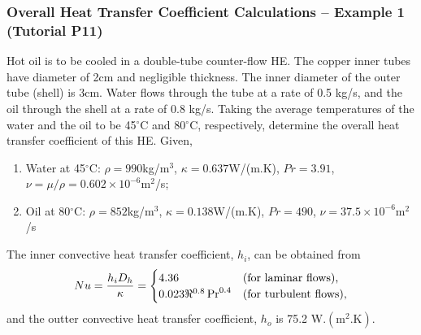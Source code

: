 \documentclass[10pt,compress,handout,ignorenonframetext,unknownkeysallowed]{beamer}
\begin{document}
\begin{frame}
  \frametitle{Overall Heat Transfer Coefficient Calculations -- Example 1 (Tutorial P11)}
Hot oil is to be cooled in a double-tube counter-flow HE. The copper inner tubes have diameter of 2cm and negligible thickness. The inner diameter of the outer tube (shell) is 3cm. Water flows through the tube at a rate of 0.5 kg/s, and the oil through the shell at a rate of 0.8 kg/s. Taking the average temperatures of the water and the oil to be 45$^{\circ}$C and 80$^{\circ}$C, respectively, determine the overall heat transfer coefficient of this HE. Given, 
\begin{enumerate} 
    \item Water at 45$^{\circ}$C: $\rho=990$kg/m$^{3}$, $\kappa=0.637$W/(m.K), $Pr=3.91$, $\nu=\mu/\rho=0.602\times 10^{-6}$m$^{2}$/s; 
    \item Oil at 80$^{\circ}$C: $\rho=852$kg/m$^{3}$, $\kappa=0.138$W/(m.K), $Pr=490$, $\nu=37.5\times 10^{-6}$m$^{2}$/s
\end{enumerate}
The inner convective heat transfer coefficient, $h_{i}$, can be obtained from
\begin{displaymath}
       Nu = \displaystyle\frac{h_{i}D_{h}}{\kappa} =
   \begin{cases}
       4.36  & \text{(for laminar flows),} \\
       0.023\Re^{0.8}\Pr^{0.4} & \text{(for turbulent flows),} \\
   \end{cases}
\end{displaymath}
and the outter convective heat transfer coefficient, $h_{o}$ is 75.2 W.$\left(\text{m}^{2}.\text{K}\right)$.

\end{frame}
\end{document}
